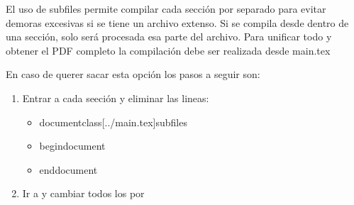 
El uso de subfiles permite compilar cada sección por separado para evitar demoras excesivas si se tiene un archivo extenso.
Si se compila desde dentro de una sección, solo será procesada esa parte del archivo. Para unificar todo y obtener el PDF completo la compilación debe ser realizada desde main.tex

En caso de querer sacar esta opción los pasos a seguir son:
\begin{enumerate}
    \item Entrar a cada seeción y eliminar las lineas:
        \begin{itemize}
            \item documentclass[../main.tex]{subfiles}
            \item begin{document}
            \item end{document}
        \end{itemize}
    \item Ir a  y cambiar todos los  por 
\end{enumerate}

